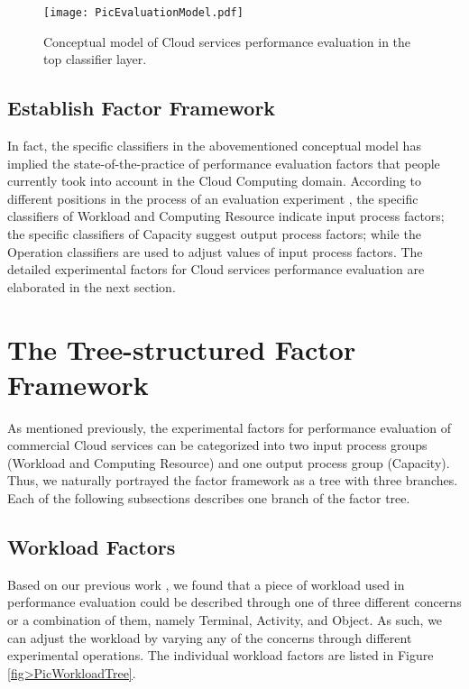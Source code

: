 \documentclass[10pt, conference, compsocconf]{IEEEtran}
\begin{document}
\begin{figure}[!t]
\centering
\texttt{[image: PicEvaluationModel.pdf]}
\caption{Conceptual model of Cloud services performance evaluation in the top classifier layer.}
\label{fig>PicEvaluationModel}
\end{figure}

\subsection{Establish Factor Framework}
In fact, the specific classifiers in the abovementioned conceptual model \cite{Li_OBrien_2012c} has implied the state-of-the-practice of performance evaluation factors that people currently took into account in the Cloud Computing domain. According to different positions in the process of an evaluation experiment \cite{Antony_2003}, the specific classifiers of Workload and Computing Resource indicate input process factors; the specific classifiers of Capacity suggest output process factors; while the Operation classifiers are used to adjust values of input process factors. The detailed experimental factors for Cloud services performance evaluation are elaborated in the next section.\\



\section{The Tree-structured Factor Framework}
\label{III}
As mentioned previously, the experimental factors for performance evaluation of commercial Cloud services can be categorized into two input process groups (Workload and Computing Resource) and one output process group (Capacity). Thus, we naturally portrayed the factor framework as a tree with three branches. Each of the following subsections describes one branch of the factor tree.
\subsection{Workload Factors}
Based on our previous work \cite{Li_OBrien_2012a,Li_OBrien_2012c}, we found that a piece of workload used in performance evaluation could be described through one of three different concerns or a combination of them, namely Terminal, Activity, and Object. As such, we can adjust the workload by varying any of the concerns through different experimental operations. The individual workload factors are listed in Figure \ref{fig>PicWorkloadTree}.
\end{document}
